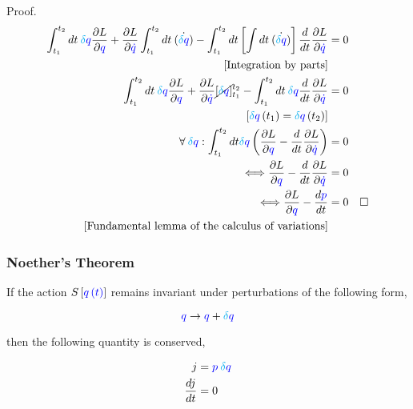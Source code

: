 \documentclass{beamer}
\begin{document}
\begin{frame}
\begin{block}{Proof.}
\begin{align*}
\int_{t_1}^{t_2} dt \: \textcolor{cyan}{\delta} \textcolor{blue}{q} \frac{\partial L}{\partial \textcolor{blue}{q}} + \frac{\partial L}{\partial \textcolor{blue}{\dot{q}}} \int_{t_1}^{t_2} dt \: \dot{\left( \textcolor{cyan}{\delta} \textcolor{blue}{{q}}\right)} - \int_{t_1}^{t_2} dt \left[ \int dt \: \dot{\left( \textcolor{cyan}{\delta} \textcolor{blue}{{q}}\right)} \right] \frac{d}{dt} \frac{\partial L}{\partial \textcolor{blue}{\dot{q}}} & = 0 \\
\left[ \text{Integration by parts} \right] \\
\int_{t_1}^{t_2} dt \: \textcolor{cyan}{\delta} \textcolor{blue}{q} \frac{\partial L}{\partial \textcolor{blue}{q}} + \frac{\partial L}{\partial \textcolor{blue}{\dot{q}}} \cancel{\left[ \textcolor{cyan}{\delta} \textcolor{blue}{{q}}\right]}_{t_1}^{t_2} - \int_{t_1}^{t_2} dt \: \textcolor{cyan}{\delta} \textcolor{blue}{q} \frac{d}{dt} \frac{\partial L}{\partial \textcolor{blue}{\dot{q}}} & = 0 \\
\left[ \textcolor{cyan}{\delta} \textcolor{blue}{q} \left( t_1 \right) = \textcolor{cyan}{\delta} \textcolor{blue}{q} \left( t_2 \right) \right] \\
\forall \: \textcolor{cyan}{\delta} \textcolor{blue}{q} : \int_{t_1}^{t_2} dt \textcolor{cyan}{\delta} \textcolor{blue}{q} \left( \frac{\partial L}{\partial \textcolor{blue}{q}} - \frac{d}{dt} \frac{\partial L}{\partial \textcolor{blue}{\dot{q}}} \right) & = 0 \\
\Longleftrightarrow \frac{\partial L}{\partial \textcolor{blue}{q}} - \frac{d}{dt} \frac{\partial L}{\partial \textcolor{blue}{\dot{q}}} & = 0 \\
\Longleftrightarrow \frac{\partial L}{\partial \textcolor{blue}{q}} - \frac{d \textcolor{blue}{p}}{dt} & = 0 & \square \\
\left[ \text{Fundamental lemma of the calculus of variations} \right]
\end{align*}
\end{block}
\end{frame}

\begin{frame}
\frametitle{Noether's Theorem}

\begin{theorem}
If the action $S \left[ \textcolor{blue}{q \left( t \right)} \right]$ remains invariant under perturbations of the following form,

$$\textcolor{blue}{q} \to \textcolor{blue}{q} + \textcolor{cyan}{\delta} \textcolor{blue}{q}$$

then the following quantity is conserved,

\begin{align*}
j & = \textcolor{blue}{p} \: \textcolor{cyan}{\delta} \textcolor{blue}{q} \\
\frac{dj}{dt} & = 0
\end{align*}
\end{theorem}
\end{frame}
\end{document}
